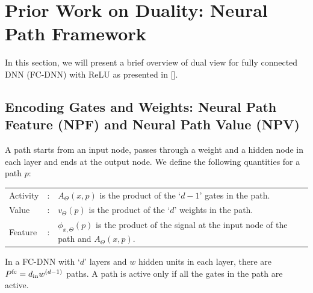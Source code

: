 \section{Prior Work on Duality: Neural Path Framework}\label{sec:dual}
In this section, we will present a brief overview of dual view for fully connected DNN (FC-DNN) with ReLU as presented in []. 

\subsection{Encoding Gates and Weights: Neural Path Feature (NPF) and Neural Path Value (NPV)}
\begin{definition}
A path starts from an input node, passes through a weight and a hidden node in each layer and ends at the output node. We define the following quantities for a path $p$:
\begin{tabular}{lcl}
 Activity&:& $A_{\Theta}(x,p)$ is the product of the `$d-1$' gates in the path. \\
Value&:& $v_{\Theta}(p)$ is the product of the `$d$' weights in the path.\\
Feature&:&   $\phi_{x,\Theta}(p)$ is the product of the signal at the input node of the path and $A_{\Theta}(x,p)$.\\
\end{tabular}
\end{definition}
In a FC-DNN with `$d$' layers and  $w$  hidden units in each layer, there are $P^{\text{fc}}=d_{\text{in}} w^{(d-1)}$ paths. A path is active only if all the gates in the path are active.
\begin{figure}[h]
\end{figure}
